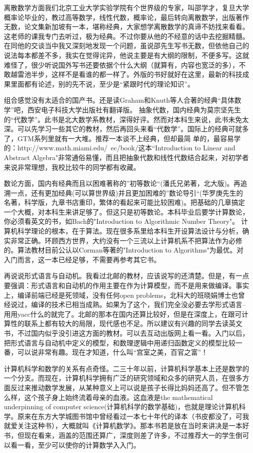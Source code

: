 离散数学方面我们北京工业大学实验学院有个世界级的专家，叫邵学才，复旦大学概率论毕业的，教过高等数学，线性代数，概率论，最后转向离散数学，出版著作无数，论文集新加坡有一本，堪称经典，大家想学离散数学的真谛不妨找来看看。这老师的课我专门去听过，极为经典。不过你要从他的不经意的话中去挖掘精髓。在同他的交谈当中我又深刻地发现一个问题，虽说邵先生写书无数，但依他自己的说法每本都差不多，我实在觉得诧异，他说主要是有大纲的限制，不便多写。这就难怪了，很少听说国外写书还要依据个什么大纲（就算有，内容也宽泛的多），不敢越雷池半步，这样不是看谁的都一样了。外版的书好就好在这里，最新的科技成果里面都有论述，别的先不说，至少是“紧跟时代的理论知识”。

组合感觉没有太适合的国产书。还是读Graham和Knuth等人合著的经典“具体数学”吧，西安电子科技大学出版社有翻译版。 抽象代数，国内经典为莫宗坚先生的“代数学”。此书是北大数学系教材，深得好评。然而对本科生来说，此书未免太深。可以先学习一些其它的教材，然后再回头来看“代数学”。国际上的经典可就多了，GTM系列里就有一大堆。推荐一本谈不上经典，但却最简
单的，最容易学的：http://www.math.miami.edu/~ec/book/这本“Introduction to Linear and Abstract Algebra"非常通俗易懂，而且把抽象代数和线性代数结合起来，对初学者来说非常理想，我校比较牛的同学都有收藏。

数论方面，国内有经典而且以困难著称的”初等数论“(潘氏兄弟著，北大版)。再追溯一点，还有更加经典(可以算世界级)并且更加困难的”数论导引“(华罗庚先生的名著，科学版，九章书店重印，繁体的看起来可能比较困难)。把基础的几章搞定一个大概，对本科生来讲足够了。但这只是初等数论。本科毕业后要学计算数论，你必须看英文的书，如Bach的"Introduction to Algorithmic Number Theory"。
计算机科学理论的根本，在于算法。现在很多系里给本科生开设算法设计与分析，确实非常正确。环顾西方世界，大约没有一个三流以上计算机系不把算法作为必修的。算法教材目前公认以Corman等著的"Introduction to Algorithms"为最优。对入门而言，这一本已经足够，不需要再参考其它书。

再说说形式语言与自动机。我看过北邮的教材，应该说写的还清楚。但是，有一点要强调：形式语言和自动机的作用主要在作为计算模型，而不是用来做编译。事实上，编译前端已经是死领域，没有任何open problems，北科大的班晓娟博士也曾经说过，编译的技术已相当成熟。如果为了这个，我们完全没必要去学形式语言--用用yacc什么的就完了。北邮的那本在国内还算比较好，但是在深度上，在跟可计算性的联系上都有较大的局限，现代感也不足。所以建议有兴趣的同学去读英文书，不过国内似乎没引进这方面的教材。可以去互动出版网上看一看。入门以后，把形式语言与自动机中定义的模型，和数理逻辑中用递归函数定义的模型比较一番，可以说非常有趣。现在才知道，什么叫“宫室之美，百官之富”！

计算机科学和数学的关系有点奇怪。二三十年以前，计算机科学基本上还是数学的一个分支。而现在，计算机科学拥有广泛的研究领域和众多的研究人员，在很多方面反过来推动数学发展，从某种意义上可以说是孩子长得比妈妈还高了。但不管怎么样，这个孩子身上始终流着母亲的血液。这血液是the mathematical underpinning of computer science(计算机科学的数学基础)，也就是理论计算机科学。原来在东方大学城图书馆中曾经看过一本七十年代的译本（书皮都没了，可我就爱关注这种书），大概就叫《计算机数学》。那本书若是放在当时来讲决是一本好书，但现在看来，涵盖的范围还算广，深度则差了许多，不过推荐大一的学生倒可以看一看，至少可以使你的计算数学入入门。

